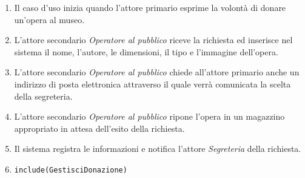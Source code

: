 \documentclass{article}
\begin{document}
		\begin{enumerate}[itemsep=8pt,parsep=0pt]
		
				\item Il caso d'uso inizia quando l'attore primario esprime la volontà di donare un'opera al museo.
		
				\item L'attore secondario \emph{Operatore al pubblico} riceve la richiesta ed inserisce nel sistema il nome, l'autore, le dimensioni, il tipo e l'immagine dell'opera.

				\item L'attore secondario \emph{Operatore al pubblico} chiede all'attore primario anche un indirizzo di posta elettronica attraverso il quale verrà comunicata la scelta della segreteria.

				\item L'attore secondario \emph{Operatore al pubblico} ripone l'opera in un magazzino appropriato in attesa dell'esito della richiesta.

				\item Il sistema registra le informazioni e notifica l'attore \emph{Segreteria} della richiesta.

				\item \texttt{include(GestisciDonazione)}						
		
		\end{enumerate}	
\end{document}
